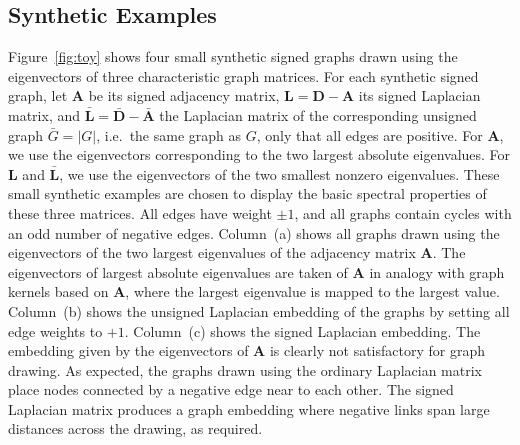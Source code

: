 \documentclass[11pt,a4paper]{book}
\begin{document}
\subsection{Synthetic Examples}
Figure~\ref{fig:toy} shows four small synthetic signed graphs drawn
using the eigenvectors of three characteristic graph matrices.
For each synthetic signed graph, let $\mathbf A$ be its signed adjacency
matrix, $\mathbf L = \mathbf D - \mathbf A$ its signed Laplacian matrix,
and $\mathbf{\bar L} = \mathbf{\bar D} - \mathbf{\bar A}$ the Laplacian matrix of the
corresponding unsigned graph $\bar G=|G|$, i.e.\ the same graph as $G$, only
that all edges are positive. 
For $\mathbf A$, we use the
eigenvectors corresponding to the two largest absolute eigenvalues. For
$\mathbf L$ and $\mathbf{\bar L}$, we use the eigenvectors of the two smallest
nonzero eigenvalues. 
These small synthetic examples are chosen to display
the basic spectral properties of these three matrices.
All edges have weight $\pm 1$, and all graphs
contain cycles with an odd number of negative edges. 
Column~(a) shows all graphs drawn using the eigenvectors of the
two largest eigenvalues of the adjacency matrix $\mathbf A$.  The
eigenvectors of largest absolute eigenvalues are taken of $\mathbf A$ in
analogy with graph kernels based on $\mathbf A$, where the largest
eigenvalue is mapped to the largest value. 
Column~(b) shows the unsigned Laplacian embedding of the graphs by
setting all edge weights to $+1$.
Column~(c) shows the signed Laplacian embedding.
The embedding given by the eigenvectors of $\mathbf A$ is clearly not
satisfactory for graph drawing.  As expected, the graphs drawn using the
ordinary Laplacian matrix place nodes connected by a negative edge near
to each other.
The signed Laplacian matrix produces a graph embedding where
negative links span large distances across the drawing, as required. 
\end{document}
